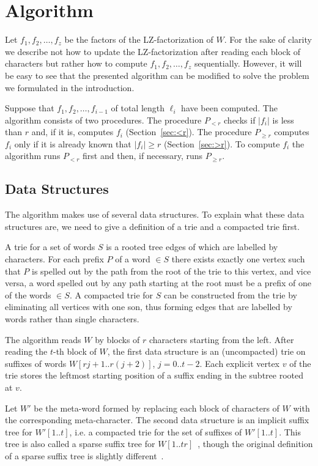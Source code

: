 \documentclass[10pt]{llncs}
\begin{document}
\section{Algorithm}
Let $f_1, f_2, \ldots, f_z$ be the factors of the LZ-factorization of $W$. For the sake of clarity we describe not how to update the LZ-factorization after reading each block of characters but rather how to compute $f_1, f_2, \ldots, f_z$ sequentially. However, it will be easy to see that the presented algorithm can be modified to solve the problem we formulated in the introduction.

Suppose that $f_1, f_2, \ldots, f_{i-1}$ of total length $\ell_i$ have been computed. The algorithm consists of two procedures. The procedure $P_{<r}$ checks if $|f_i|$ is less than $r$ and, if it is, computes $f_i$ (Section~\ref{sec:<r}). The procedure $P_{\geq r}$ computes $f_i$ only if it is already known that $|f_i| \geq r$ (Section~\ref{sec:>r}). To compute $f_i$ the algorithm runs $P_{<r}$ first and then, if necessary, runs $P_{\geq r}$.

\subsection{Data Structures}
The algorithm makes use of several data structures. To explain what these data structures are, we need to give a definition of a trie and a compacted trie first.

\begin{definition}
A trie for a set of words $S$ is a rooted tree edges of which are labelled by characters. For each prefix $P$ of a word $\in S$ there exists exactly one vertex such that $P$ is spelled out by the path from the root of the trie to this vertex, and vice versa, a word spelled out by any path starting at the root must be a prefix of one of the words $\in S$. A compacted trie for $S$ can be constructed from the trie by eliminating all vertices with one son, thus forming edges that are labelled by words rather than single characters.
\end{definition}

The algorithm reads $W$ by blocks of $r$ characters starting from the left. After reading the $t$-th block of $W$, the first data structure is an (uncompacted) trie on suffixes of words $W[rj+1..r(j+2)]$, $j = 0..t-2$. Each explicit vertex $v$ of the trie stores the leftmost starting position of a suffix ending in the subtree rooted at $v$.

Let $W'$ be the meta-word formed by replacing each block of characters of $W$ with the corresponding meta-character. The second data structure is an implicit suffix tree for $W'[1..t]$, i.e. a compacted trie for the set of suffixes of $W'[1..t]$. This tree is also called a sparse suffix tree for $W[1..tr]$~\cite{ChienHonShahVitterDCC08,HonShahThanVitterSPIRE09,ChiuHonShahVitterDCC10}, though the original definition of a sparse suffix tree is slightly different~\cite{KU-96}. 
\end{document}
